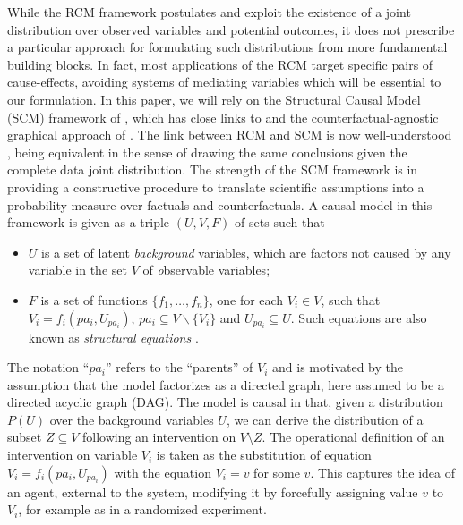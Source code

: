 While the RCM framework postulates and exploit the existence of a
joint distribution over observed variables and potential outcomes, it
does not prescribe a particular approach for formulating such
distributions from more fundamental building blocks. In fact, most
applications of the RCM target specific pairs of cause-effects,
avoiding systems of mediating variables which will be essential to our
formulation. In this paper, we will rely on the Structural Causal
Model (SCM) framework of \cite{pearl:00}, which has close links to
\cite{robins:86} and the counterfactual-agnostic graphical approach of
\cite{sgs:93}. The link between RCM and SCM is now well-understood
\cite{pearl:00,morgan:14}, being equivalent in the sense of drawing
the same conclusions given the complete data joint distribution. The
strength of the SCM framework is in providing a constructive procedure
to translate scientific assumptions into a probability measure over
factuals and counterfactuals.  A causal model in this framework is
given as a triple $(U, V, F)$ of sets such that
%
\begin{itemize}
\item $U$ is a set of latent \emph{background} variables, which are
  factors not caused by any variable in the set $V$ of {\emph
    observable} variables;
\item $F$ is a set of functions $\{f_1, \dots, f_n\}$, one for each $V_i \in V$, such
that $V_i = f_i(pa_i, U_{pa_i})$, $pa_i \subseteq V \backslash
\{V_i\}$ and $U_{pa_i} \subseteq U$. Such equations are also known as
\emph{structural equations} \cite{bol:89}.
\end{itemize}
%


The notation ``$pa_i$'' refers to the ``parents'' of $V_i$ and is
motivated by the assumption that the model factorizes as a directed
graph, here assumed to be a directed acyclic graph (DAG).  The model
is causal in that, given a distribution $P(U)$ over the background
variables $U$, we can derive the distribution of a subset $Z \subseteq
V$ following an intervention on $V\setminus Z$. The operational
definition of an intervention on variable $V_i$ is taken as the
substitution of equation $V_i = f_i(pa_i, U_{pa_i})$ with the equation
$V_i = v$ for some $v$. This captures the idea of an agent, external
to the system, modifying it by forcefully assigning value $v$ to
$V_i$, for example as in a randomized experiment.

